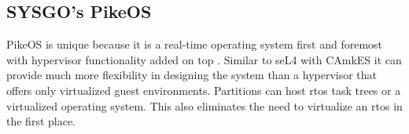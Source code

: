 \subsection{SYSGO's PikeOS}
PikeOS is unique because it is a real-time operating system first and foremost with hypervisor functionality added on top \cite{pikeos}. Similar to seL4 with CAmkES it can provide much more flexibility in designing the system than a hypervisor that offers only virtualized guest environments. Partitions can host \acrshort{rtos} task trees or a virtualized operating system. This also eliminates the need to virtualize an \acrshort{rtos} in the first place.

